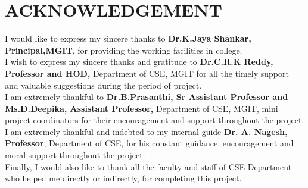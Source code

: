 \chapter*{ACKNOWLEDGEMENT}

\doublespace

\noindent
I would like to express my sincere thanks to \textbf{Dr.K.Jaya Shankar, Principal,MGIT}, for providing the working facilities in college.\\

\noindent
I wish to express my sincere thanks and gratitude to \textbf{Dr.C.R.K Reddy, Professor and HOD,} Department of CSE, MGIT for all the timely support and valuable suggestions during the period of project. \\

\noindent
I am extremely thankful to \textbf{Dr.B.Prasanthi, Sr Assistant Professor and Ms.D.Deepika, Assistant Professor,} Department of CSE, MGIT, mini project coordinators for their encouragement and support throughout the project. \\

\noindent
I am extremely thankful and indebted to my internal guide \textbf{Dr. A. Nagesh, Professor}, Department of CSE, for his constant guidance, encouragement and moral support throughout the project. \\

\noindent
Finally, I would also like to thank all the faculty and staff of CSE Department who helped me directly or indirectly, for completing this project.
\vskip 2cm
\vskip -1cm

\par\newpage
